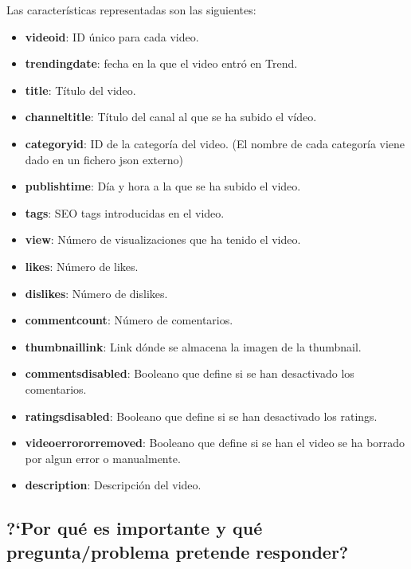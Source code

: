 \documentclass[a4paper,12pt]{article}
\begin{document}
Las caracter\'isticas representadas son las siguientes:

\begin{itemize}

\item \textbf{video{\textunderscore}id}: ID \'unico para cada video.
\item \textbf{trending{\textunderscore}date}: fecha en la que el video entr\'o en Trend.
\item \textbf{title}: T\'itulo del video.
\item \textbf{channel{\textunderscore}title}: T\'itulo del canal al que se ha subido el v\'ideo.
\item \textbf{category{\textunderscore}id}: ID de la categor\'ia del video. (El nombre de cada categor\'ia viene dado en un fichero json externo)
\item \textbf{publish{\textunderscore}time}: D\'ia y hora a la que se ha subido el video.
\item \textbf{tags}: SEO tags introducidas en el video.
\item \textbf{view}: N\'umero de visualizaciones que ha tenido el video.
\item \textbf{likes}: N\'umero de likes.
\item \textbf{dislikes}: N\'umero de dislikes.
\item \textbf{comment{\textunderscore}count}: N\'umero de comentarios.
\item \textbf{thumbnail{\textunderscore}link}: Link d\'onde se almacena la imagen de la thumbnail.
\item \textbf{comments{\textunderscore}disabled}: Booleano que define si se han desactivado los comentarios.
\item \textbf{ratings{\textunderscore}disabled}: Booleano que define si se han desactivado los ratings.
\item \textbf{video{\textunderscore}error{\textunderscore}or{\textunderscore}removed}: Booleano que define si se han el video se ha borrado por algun error o manualmente.
\item \textbf{description}: Descripci\'on del video.

\end{itemize}

\subsection[item_importancia]{?`Por qu\'e es importante y qu\'e  pregunta/problema pretende responder?}
\end{document}
